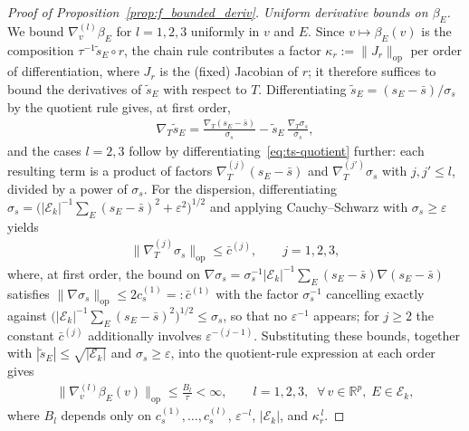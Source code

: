 \documentclass[12pt]{article}
\newcommand{\op}{\mathrm{op}}
\newcommand{\real}{\mathbb{R}}
\newcommand{\Ek}{\mathcal{E}_{k}}      %
\newcommand{\snoise}{\sigma_{s}}
\begin{document}
\begin{appendices}
\begin{proof}[Proof of Proposition~\ref{prop:f_bounded_deriv}]
\medskip\noindent\emph{Uniform derivative bounds on $\beta_E$.}
We bound $\nabla_v^{(l)}\beta_E$ for $l=1,2,3$ uniformly in $v$ and $E$.
Since $v\mapsto\beta_E(v)$ is the composition
$\tau^{-1}\widetilde s_E\circ r$, the chain rule contributes a factor
$\kappa_r:=\|J_r\|_{\op}$ per order of differentiation, where $J_r$ is
the (fixed) Jacobian of $r$; it therefore suffices to bound the
derivatives of $\widetilde s_E$ with respect to $T$. Differentiating $\widetilde s_E=(s_E-\bar s)/\snoise$ by the quotient
rule gives, at first order,
\begin{align}
  \label{eq:ts-quotient}
  \nabla_T\widetilde s_E
  =\frac{\nabla_T(s_E-\bar s)}{\snoise}
   -\widetilde s_E\,\frac{\nabla_T\snoise}{\snoise},
\end{align}
and the cases $l=2,3$ follow by differentiating~\eqref{eq:ts-quotient}
further: each resulting term is a product of factors
$\nabla_T^{(j)}(s_E-\bar s)$ and $\nabla_T^{(j')}\snoise$ with
$j,j'\le l$, divided by a power of $\snoise$. For the dispersion,
differentiating
$\snoise=\big(|\Ek|^{-1}\sum_E(s_E-\bar s)^2+\varepsilon^2\big)^{1/2}$
and applying Cauchy--Schwarz with $\snoise\ge\varepsilon$ yields
\begin{align}
  \label{eq:snoise-bound}
  \|\nabla_T^{(j)}\snoise\|_{\op}\le\bar c^{(j)},
  \qquad j=1,2,3,
\end{align}
where, at first order, the bound on
$\nabla \snoise=\snoise^{-1} |\Ek|^{-1}\sum_E (s_E-\bar s)\nabla(s_E -\bar s)$
satisfies $\|\nabla\snoise\|_{\op}\le 2c_s^{(1)}=:\bar c^{(1)}$ with the
factor $\snoise^{-1}$ cancelling exactly against
$\big(|\Ek|^{-1}\sum_E(s_E-\bar s)^2\big)^{1/2}\le\snoise$, so that no
$\varepsilon^{-1}$ appears; for $j\ge2$ the constant $\bar c^{(j)}$
additionally involves $\varepsilon^{-(j-1)}$. Substituting these bounds,
together with $|\widetilde s_E|\le\sqrt{|\Ek|}$ and $\snoise\ge\varepsilon$,
into the quotient-rule expression at each order gives
\begin{align}
  \label{eq:beta-deriv-bound}
  \|\nabla_v^{(l)}\beta_E(v)\|_{\op}\le\frac{B_l}{\tau}<\infty,
  \qquad l=1,2,3,\;\;\forall\,v\in\real^p,\;E\in\Ek,
\end{align}
where $B_l$ depends only on $c_s^{(1)},\dots,c_s^{(l)}$,
$\varepsilon^{-l}$, $|\Ek|$, and $\kappa_r^{\,l}$.


\end{proof}
\end{appendices}
\end{document}
